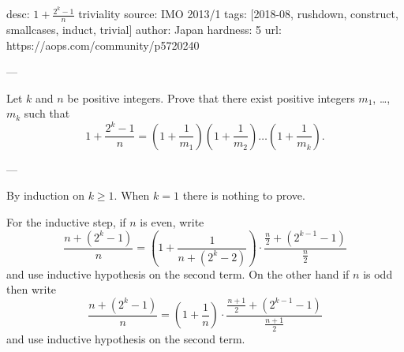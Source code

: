 desc: $1 + \frac{2^k-1}{n}$ triviality
source: IMO 2013/1
tags: [2018-08, rushdown, construct, smallcases, induct, trivial]
author: Japan
hardness: 5
url: https://aops.com/community/p5720240

---

Let  $k$ and $n$ be positive integers.
Prove that there exist positive integers $m_1$, \dots, $m_k$
such that
\[ 1 + \frac{2^k-1}{n} = \left( 1 + \frac{1}{m_1} \right) \left( 1 + \frac{1}{m_2} \right)
  \dots \left( 1 + \frac{1}{m_k} \right). \]

---

By induction on $k \ge 1$.
When $k = 1$ there is nothing to prove.

For the inductive step, if $n$ is even, write
\[
  \frac{n + (2^k-1)}{n}
  = \left( 1 + \frac{1}{n + (2^k-2)} \right) \cdot \frac{\frac n2 + (2^{k-1}-1)}{\frac n2}
\]
and use inductive hypothesis on the second term.
On the other hand if $n$ is odd then write
\[
  \frac{n + (2^k-1)}{n}
  = \left( 1 + \frac{1}{n} \right) \cdot \frac{\frac{n+1}{2} + (2^{k-1}-1)}{\frac{n+1}2}
\]
and use inductive hypothesis on the second term.
